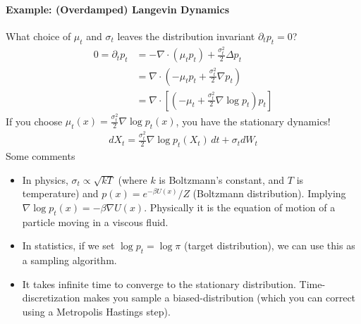 \paragraph{Example: (Overdamped) Langevin Dynamics} What choice of $\mu_t$ and $\sigma_t$ leaves the distribution invariant $\partial_t p_t = 0$?
\begin{align}
	0 = \partial_t p_t & = -\nabla \cdot (\mu_t p_t) + \frac{\sigma_t^2}{2} \Delta p_t\\
	& = \nabla \cdot (- \mu_t p_t + \frac{\sigma_t^2}{2} \nabla p_t)\\
	& = \nabla \cdot [(- \mu_t + \frac{\sigma_t^2}{2} \nabla \log p_t ) p_t]
\end{align}
If you choose $\mu_t(x) = \frac{\sigma_t^2}{2} \nabla \log p_t(x)$, you have the stationary dynamics!
\begin{align}
	dX_t = \frac{\sigma_t^2}{2}\nabla \log p_t(X_t) \, dt + \sigma_t dW_t
\end{align}
Some comments
\begin{itemize}
	\item In physics, $\sigma_t \propto \sqrt{kT}$ (where $k$ is Boltzmann's constant, and $T$ is temperature) and  $p(x) = e^{-\beta U(x)} / Z$ (Boltzmann distribution). Implying $\nabla \log p_t(x) = - \beta \nabla U(x)$. Physically it is the equation of motion of a particle moving in a viscous fluid.
	\item In statistics, if we set $\log p_t = \log \pi$ (target distribution), we can use this as a sampling algorithm. 
	\item It takes infinite time to converge to the stationary distribution. Time-discretization makes you sample a biased-distribution (which you can correct using a Metropolis Hastings step).
\end{itemize}


